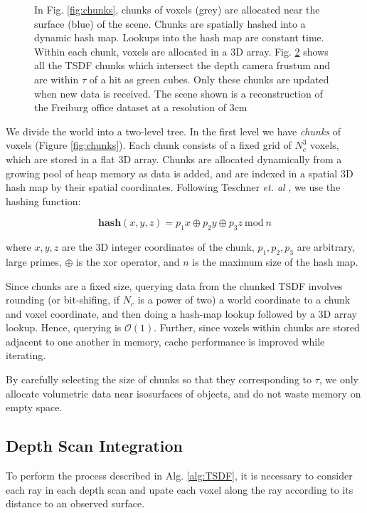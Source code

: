 \documentclass[10pt,twocolumn,letterpaper]{article}
\begin{document}
\begin{figure}
\begin{subfigure}{0.48\columnwidth}
      \caption{}
 	 \label{fig:frustum_cull}
  \end{subfigure}
  \caption{In Fig. \ref{fig:chunks}, chunks of voxels (grey) are allocated near
  the surface (blue) of the scene. Chunks are spatially hashed \cite{SpatialHashing} into a
      dynamic hash map. Lookups into the hash map are constant time. Within each
      chunk, voxels are allocated in a 3D array. Fig.
      \ref{fig:frustum_cull} shows all the TSDF chunks which intersect the depth
      camera frustum  and are within $\tau$ of a hit as green cubes. Only these
      chunks are updated when new data is received. The scene shown is a
      reconstruction of the Freiburg office \cite{FREIBURG} dataset at a
      resolution of 3cm}
\end{figure} 

We divide the world into a two-level tree. In the first level we have
\emph{chunks} of voxels (Figure \ref{fig:chunks}). Each chunk consists of a
fixed grid of $N_c^3$ voxels, which are stored in a flat 3D array. Chunks are
allocated dynamically from a growing pool of heap memory as data is added, and
are indexed in a spatial 3D hash map \cite{SpatialHashing} by their spatial
coordinates. Following Teschner \emph{et. al} \cite{SpatialHashing}, we use the
hashing function:

\begin{equation}
\textbf{hash}(x, y, z) = p_1 x\oplus p_2 y \oplus p_3 z
~\text{mod}~n
\end{equation}

\noindent where $x, y, z$ are the 3D integer coordinates of the chunk, $p_1,
p_2, p_3$ are arbitrary, large primes, $\oplus$ is the xor operator, and $n$ is
the maximum size of the hash map.

Since chunks are a fixed size, querying data from the chunked TSDF involves
rounding (or bit-shifing, if $N_c$ is a power of two) a world coordinate to a
chunk and voxel coordinate, and then doing a hash-map lookup followed by a 3D
array lookup. Hence, querying is $\mathcal{O}(1)$. Further, since voxels within
chunks are stored adjacent to one another in memory, cache performance is
improved while iterating.

By carefully selecting the size of chunks so that they corresponding to $\tau$,
we only allocate volumetric data near isosurfaces of objects, and do not waste
memory on empty space.

\subsection{Depth Scan Integration}
\label{section:scan_integration}
To perform the process described in Alg. \ref{alg:TSDF}, it is necessary
to consider each ray in each depth scan and upate each voxel
along the ray according to its distance to an observed surface.
\end{document}
